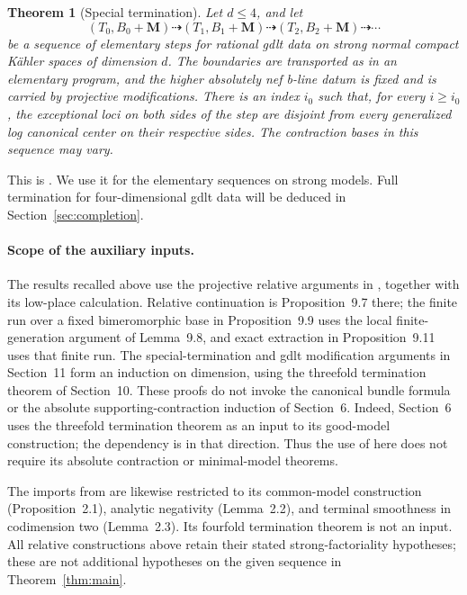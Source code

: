 \documentclass[11pt]{amsart}
\newtheorem{theorem}{Theorem}[section]
\theoremstyle{definition}
\theoremstyle{remark}
\numberwithin{equation}{section}
\newcommand{\M}{\mathbf{M}}
\begin{document}
\begin{theorem}[Special termination]\label{thm:special-termination}
Let \(d\leq4\), and let
\[
 (T_0,B_0+\M)\dashrightarrow(T_1,B_1+\M)
 \dashrightarrow(T_2,B_2+\M)\dashrightarrow\cdots
\]
be a sequence of elementary steps for rational gdlt data on strong normal
compact K\"ahler spaces of dimension \(d\).  The boundaries are transported
as in an elementary program, and the higher absolutely nef b-line datum is fixed and is
carried by projective modifications.  There is an index \(i_0\) such that,
for every \(i\geq i_0\), the exceptional loci on both sides of the step are
disjoint from every generalized log canonical center on their respective
sides.  The contraction bases in this sequence may vary.
\end{theorem}

This is \cite[Theorem~11.3]{KahlerAuxiliary}.  We use it for the elementary
sequences on strong models.  Full termination for four-dimensional gdlt
data will be deduced in Section~\ref{sec:completion}.

\paragraph{Scope of the auxiliary inputs.}
The results recalled above use the projective relative arguments in
\cite[Sections~9--11]{KahlerAuxiliary}, together with its low-place
calculation.  Relative continuation is Proposition~9.7 there; the finite
run over a fixed bimeromorphic base in Proposition~9.9 uses the local
finite-generation argument of Lemma~9.8, and exact extraction in
Proposition~9.11 uses that finite run.  The special-termination and gdlt
modification arguments in Section~11 form an induction on dimension,
using the threefold termination theorem of Section~10.  These proofs do
not invoke the canonical bundle formula or the absolute
supporting-contraction induction of Section~6.  Indeed, Section~6 uses
the threefold termination theorem as an input to its good-model
construction; the dependency is in that direction.  Thus the use of
\cite{KahlerAuxiliary} here does not require its absolute contraction or
minimal-model theorems.

The imports from \cite{CanonicalKahler} are likewise restricted to its
common-model construction (Proposition~2.1), analytic negativity
(Lemma~2.2), and terminal smoothness in codimension two (Lemma~2.3).
Its fourfold termination theorem is not an input.  All relative
constructions above retain their stated strong-factoriality hypotheses;
these are not additional hypotheses on the given sequence in
Theorem~\ref{thm:main}.
\end{document}
